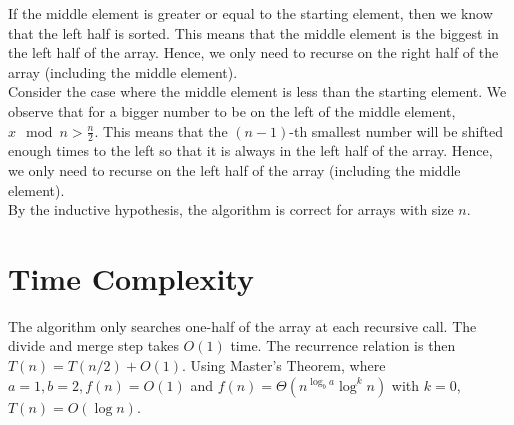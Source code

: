 \documentclass{article}
\begin{document}
    If the middle element is greater or equal to the starting element, then we know that the left half is sorted. This means that the middle element is the biggest in the left half of the array. Hence, we only need to recurse on the right half of the array (including the middle element). 
    \\
    
    Consider the case where the middle element is less than the starting element. We observe that for a bigger number to be on the left of the middle element, $x \mod n > \frac{n}{2}$. This means that the $(n-1)$-th smallest number will be shifted enough times to the left so that it is always in the left half of the array. Hence, we only need to recurse on the left half of the array (including the middle element). 
    \\
    
    By the inductive hypothesis, the algorithm is correct for arrays with size $n$.
    
    \section*{Time Complexity} 

    The algorithm only searches one-half of the array at each recursive call. The divide and merge step takes $O(1)$ time. The recurrence relation is then $T(n) = T(n/2) + O(1)$. Using Master's Theorem, where $a=1, b=2, f(n)=O(1)$ and $f(n) = \Theta(n^{\log_b a} \log^k n)$ with $k=0$, $T(n) = O(\log n)$.
\end{document}
